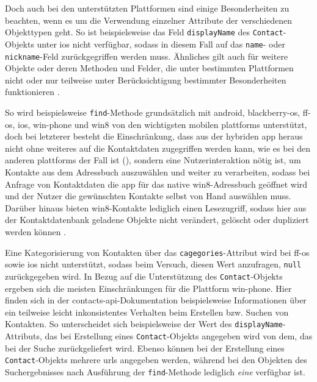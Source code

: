Doch auch bei den unterstützten Plattformen sind einige Besonderheiten zu beachten, wenn es um die Verwendung einzelner Attribute der verschiedenen Objekttypen geht.
So ist beispielsweise das Feld \lstinline|displayName| des \lstinline|Contact|-Objekts unter \gls{ios} nicht verfügbar, sodass in diesem Fall auf das \lstinline|name|- oder \lstinline|nickname|-Feld zurückgegriffen werden muss.
Ähnliches gilt auch für weitere Objekte oder deren Methoden und Felder, die unter bestimmten Plattformen nicht oder nur teilweise unter Berücksichtigung bestimmter Besonderheiten funktionieren \cite{Cordova_Plugin_Registry_Contacts}.

So wird beispielsweise \lstinline|find|-Methode grundsätzlich mit \gls{android}, \gls{blackberry-os}, \gls{ff-os}, \gls{ios}, \gls{win-phone} und \gls{win8} von den wichtigsten mobilen \glspl{plattform} unterstützt, doch bei letzterer besteht die Einschränkung, dass aus der hybriden \gls{app} heraus nicht ohne weiteres auf die Kontaktdaten zugegriffen werden kann, wie es bei den anderen \glspl{plattform} der Fall ist (\so), sondern eine Nutzerinteraktion nötig ist, um Kontakte aus dem Adressbuch auszuwählen und weiter zu verarbeiten, sodass bei Anfrage von Kontaktdaten die \gls{app} für das native \gls{win8}-Adressbuch geöffnet wird und der Nutzer die gewünschten Kontakte selbst von Hand auswählen muss.
Darüber hinaus bieten \gls{win8}-Kontakte lediglich einen Lesezugriff, sodass hier aus der Kontaktdatenbank geladene Objekte nicht verändert, gelöscht oder dupliziert werden können \cite{Cordova_Plugin_Registry_Contacts}.

Eine Kategorisierung von Kontakten über das \lstinline|cagegories|-Attribut wird bei \gls{ff-os} sowie \gls{ios} nicht unterstützt, sodass beim Versuch, diesen Wert anzufragen, \lstinline|null| zurückgegeben wird.
In Bezug auf die Unterstützung des \lstinline|Contact|-Objekts ergeben sich die meisten Einschränkungen für die Plattform \gls{win-phone}.
Hier finden sich in der \gls{contacts-api}-Dokumentation beispielsweise Informationen über ein teilweise leicht inkonsistentes Verhalten beim Erstellen bzw. Suchen von Kontakten.
So unterscheidet sich beispielsweise der Wert des \lstinline|displayName|-Attributs, das bei Erstellung eines \lstinline|Contact|-Objekts angegeben wird von dem, das bei der Suche zurückgeliefert wird.
Ebenso können bei der Erstellung eines \lstinline|Contact|-Objekts mehrere \glspl{url} angegeben werden, während bei den Objekten des Suchergebnisses nach Ausführung der \lstinline|find|-Methode lediglich \emph{eine} verfügbar ist.

